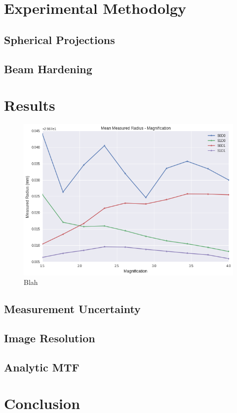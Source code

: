 \documentclass[
  twoside,
  11pt, a4paper,
  footinclude=true,
  headinclude=true,
  cleardoublepage=empty
]{scrbook}
\begin{document}
\chapter{Experimental Methodolgy}
\section{Spherical Projections}
\section{Beam Hardening}
\chapter{Results}

\begin{figure}[h!]
  \caption{Blah}
  \centering
    \includegraphics[width=\textwidth]{figures/output_6_0.png}
\end{figure}


\section{Measurement Uncertainty}
\section{Image Resolution}
\section{Analytic MTF}
\chapter{Conclusion}
\end{document}
